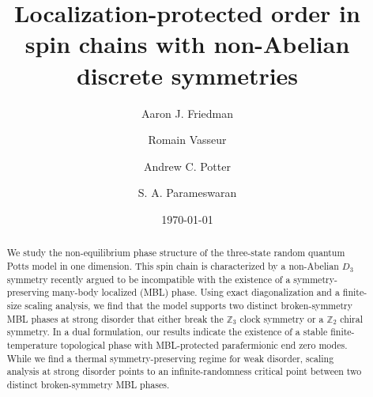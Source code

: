 \documentclass[prb,aps, twocolumn, superscriptaddress]{revtex4-1}
\begin{document}
\title{Localization-protected order  in  spin chains with  non-Abelian discrete symmetries}
\author{Aaron J. Friedman}
\author {Romain Vasseur}
\author{Andrew C. Potter}
\author{S. A. Parameswaran}


\date{\today}
\begin{abstract}

{We  study the non-equilibrium phase structure of the three-state random quantum Potts model in one dimension. This spin chain is characterized by a non-Abelian $D_3$ symmetry recently argued to be incompatible with the existence of a symmetry-preserving many-body localized (MBL) phase. Using exact diagonalization and a finite-size scaling analysis, we find that the model supports two distinct broken-symmetry MBL phases at strong disorder that either break the ${\mathbb{Z}_3}$ clock symmetry or a ${\mathbb{Z}_2}$ chiral symmetry. In a dual formulation, our results indicate the existence of a stable finite-temperature topological phase with MBL-protected parafermionic end zero modes. While we find a thermal symmetry-preserving regime for weak disorder,  scaling analysis at strong disorder points to an infinite-randomness critical point between two distinct broken-symmetry MBL phases.}



\end{abstract}
\maketitle
\end{document}
